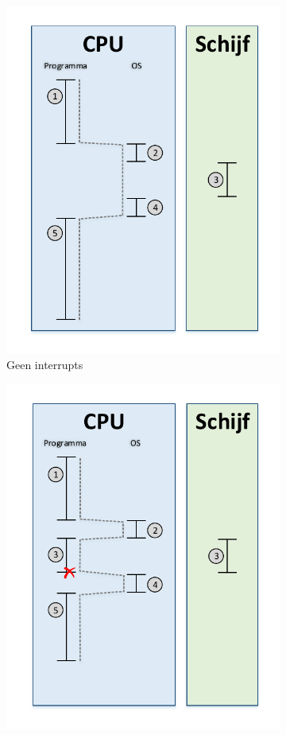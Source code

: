 \begin{figure}
\centering
\begin{subfigure}{.5\textwidth}
  \centering
  \includegraphics[width=.85\linewidth]{images/ProgramFlowNoInterrupts.pdf}
  \caption{Geen interrupts}
  \label{fig:progflownoint}
\end{subfigure}%
\begin{subfigure}{.5\textwidth}
  \centering
  \includegraphics[width=.85\linewidth]{images/ProgramFlowWithInterrupts.pdf}

\end{subfigure}
\end{figure}

